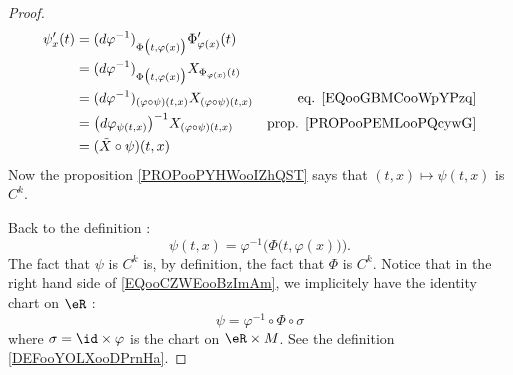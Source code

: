 \begin{proof}
\begin{subequations}
\begin{align}
			\psi_x'(t) & =(d\varphi^{-1})_{\Phi\big( t,\varphi(x) \big)}\Phi_{\varphi(x)}'(t)                                            \\
			           & =(d\varphi^{-1})_{\Phi\big( t,\varphi(x) \big)}X_{\Phi_{\varphi(x)}(t)}                                         \\
			           & = (d\varphi^{-1})_{(\varphi\circ\psi)(t,x)}X_{(\varphi\circ\psi)(t,x)}  & \text{eq. \eqref{EQooGBMCooWpYPzq}}   \\
			           & = \big( d\varphi_{\psi(t,x)} \big)^{-1}X_{(\varphi\circ\psi)(t,x)}      & \text{prop. \ref{PROPooPEMLooPQcywG}} \\
			           & =(\tilde X\circ\psi)(t,x)
		\end{align}
	\end{subequations}
	Now the proposition \ref{PROPooPYHWooIZhQST} says that \( (t,x)\mapsto \psi(t,x)\) is \( C^k\).

	Back to the definition :
	\begin{equation}		\label{EQooCZWEooBzImAm}
		\psi(t,x)=\varphi^{-1}\Big( \Phi\big(t,\varphi(x)\big) \Big).
	\end{equation}
	The fact that \( \psi\) is \( C^k\) is, by definition, the fact that \( \Phi\) is \( C^k\). Notice that in the right hand side of \eqref{EQooCZWEooBzImAm}, we implicitely have the identity chart on \( \eR\) :
	\begin{equation}
		\psi=\varphi^{-1}\circ\Phi\circ\sigma
	\end{equation}
	where \( \sigma=\id\times \varphi\) is the chart on \( \eR\times M\). See the definition \ref{DEFooYOLXooDPrnHa}.
\end{proof}



